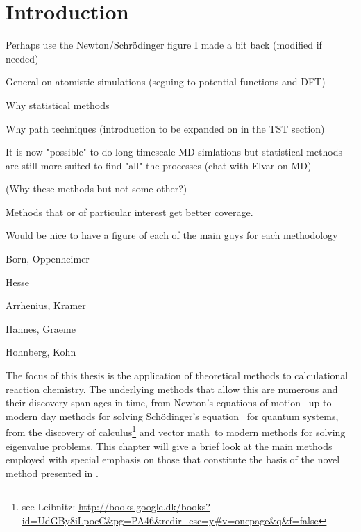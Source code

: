 \section{Introduction}
\label{sec:methods-introduction}


\bit
\item Perhaps use the Newton/Schr\"odinger figure I made a bit back (modified if needed)
\item General on atomistic simulations (seguing to potential functions and DFT)
\item Why statistical methods
\item Why path techniques (introduction to be expanded on in the TST section)
\item It is now "possible" to do long timescale MD simlations but statistical methods are still more suited to find "all" the processes (chat with Elvar on MD)
\item (Why these methods but not some other?)
\item Methods that or of particular interest get better coverage.

\item Would be nice to have a figure of each of the main guys for each methodology
\bit
\item Born, Oppenheimer
\item Hesse
\item Arrhenius, Kramer
\item Hannes, Graeme
\item Hohnberg, Kohn
\eit
\eit

The focus of this thesis is the application of theoretical methods to calculational reaction chemistry.
The underlying methods that allow this are numerous and their discovery span ages in time, from Newton's equations of motion~\cite{newton-latin} up to modern day methods for solving Sch\"odinger's equation~\cite{schrodinger-equation-1926} for quantum systems\cite{hohenberg-kohn-1964, gpaw-review-2010}, from the discovery of calculus\citemiss\footnote{see Leibnitz: \url{http://books.google.dk/books?id=UdGBy8iLpocC&pg=PA46&redir_esc=y\#v=onepage&q&f=false}} and vector math~\citemiss to modern methods for solving eigenvalue problems\citemiss.
This chapter will give a brief look at the main methods employed with special emphasis on those that constitute the basis of the novel method presented in .

